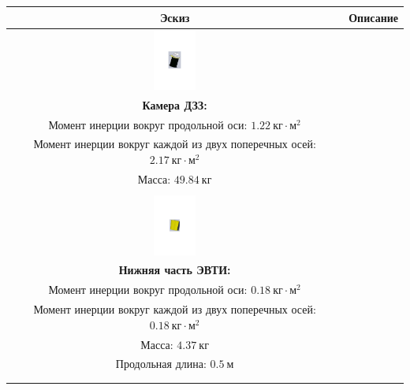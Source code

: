 \begin{table}[ht!]
    \centering
    \begin{tabular}{|c|c|}
        \hline
            Эскиз & Описание \\
        \hline
            \includegraphics[height=20mm, keepaspectratio]
                            {./src/pictures/sattelite_3d_images/camera} &
            \shortstack[l] {
                \rule{0pt}{2mm} \\
                \textbf{Камера ДЗЗ:} \\
                Момент инерции вокруг продольной оси: $1.22 ~\textit{кг} \cdot \textit{м}^{2}$ \\
                Момент инерции вокруг каждой из двух поперечных  осей: $2.17 ~\textit{кг} \cdot \textit{м}^{2}$ \\
                Масса: $49.84 ~\textit{кг}$ \\
                \rule{0pt}{2mm}
            } \\
        \hline
            \includegraphics[height=20mm, keepaspectratio]
                            {./src/pictures/sattelite_3d_images/bottom_shell_part} &
            \shortstack[l] {
                \rule{0pt}{2mm} \\
                \textbf{Нижняя часть ЭВТИ:} \\
                Момент инерции вокруг продольной оси: $0.18 ~\textit{кг} \cdot \textit{м}^{2}$ \\
                Момент инерции вокруг каждой из двух поперечных  осей: $0.18 ~\textit{кг} \cdot \textit{м}^{2}$ \\
                Масса: $4.37 ~\textit{кг}$ \\
                Продольная длина: $0.5 ~\textit{м}$ \\
                \rule{0pt}{2mm}
            } \\
        \hline
            \includegraphics[height=20mm, keepaspectratio]

\end{tabular}
\end{table}
